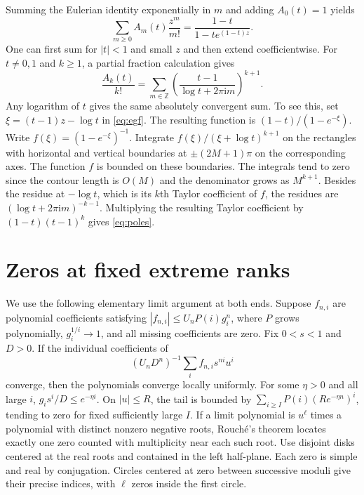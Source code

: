 \documentclass[11pt]{article}
\newcommand{\ii}{\mathrm i}
\begin{document}
Summing the Eulerian identity exponentially in \(m\) and adding \(A_0(t)=1\) yields
\begin{equation}\label{eq:egf}
 \sum_{m\ge0} A_m(t)\frac{z^m}{m!}=\frac{1-t}{1-t e^{(1-t)z}}.
\end{equation}
One can first sum for \(|t|<1\) and small \(z\) and then extend coefficientwise. For \(t\ne0,1\) and \(k\ge1\), a partial fraction calculation gives
\begin{equation}\label{eq:poles}
 \frac{A_k(t)}{k!}=\sum_{m\in\mathbb Z}\left(\frac{t-1}{\log t+2\pi\ii m}\right)^{k+1}.
\end{equation}
Any logarithm of \(t\) gives the same absolutely convergent sum. To see this, set \(\xi=(t-1)z-\log t\) in \eqref{eq:egf}. The resulting function is \((1-t)/(1-e^{-\xi})\). Write \(f(\xi)=(1-e^{-\xi})^{-1}\). Integrate \(f(\xi)/(\xi+\log t)^{k+1}\) on the rectangles with horizontal and vertical boundaries at \(\pm(2M+1)\pi\) on the corresponding axes. The function \(f\) is bounded on these boundaries. The integrals tend to zero since the contour length is \(O(M)\) and the denominator grows as \(M^{k+1}\). Besides the residue at \(-\log t\), which is its \(k\)th Taylor coefficient of \(f\), the residues are \((\log t+2\pi\ii m)^{-k-1}\). Multiplying the resulting Taylor coefficient by \((1-t)(t-1)^k\) gives \eqref{eq:poles}.

\section{Zeros at fixed extreme ranks}

We use the following elementary limit argument at both ends. Suppose \(f_{n,i}\) are polynomial coefficients satisfying \(|f_{n,i}|\le U_n P(i)g_i^n\), where \(P\) grows polynomially, \(g_i^{1/i}\to1\), and all missing coefficients are zero. Fix \(0<s<1\) and \(D>0\). If the individual coefficients of
\[
 (U_nD^n)^{-1}\sum_i f_{n,i}s^{ni} u^i
\]
converge, then the polynomials converge locally uniformly. For some \(\eta>0\) and all large \(i\), \(g_i s^i/D\le e^{-\eta i}\). On \(|u|\le R\), the tail is bounded by \(\sum_{i\ge I}P(i)(Re^{-\eta n})^i\), tending to zero for fixed sufficiently large \(I\). If a limit polynomial is \(u^\ell\) times a polynomial with distinct nonzero negative roots, Rouch\'e's theorem locates exactly one zero counted with multiplicity near each such root. Use disjoint disks centered at the real roots and contained in the left half-plane. Each zero is simple and real by conjugation. Circles centered at zero between successive moduli give their precise indices, with \(\ell\) zeros inside the first circle.
\end{document}
